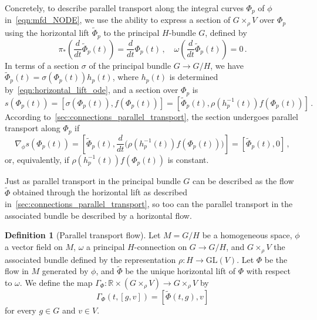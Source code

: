 \documentclass[12pt,a4paper]{article}
\numberwithin{equation}{section}
\newcommand{\R}{\mathbb{R}}
\theoremstyle{plain}
\theoremstyle{definition}
\newtheorem{definition}[theorem]{Definition}
\theoremstyle{remark}
\begin{document}
Concretely, to describe parallel transport along the integral curves $\Phi_p$ of $\phi$ in~\eqref{eqn:mfd_NODE}, we use the ability to express a section of $G \times_{\rho} V$ over $\Phi_p$ using the horizontal lift $\tilde{\Phi}_p$ to the principal $H$-bundle $G$, defined by
\begin{equation}
    \pi_*\left(\frac{d}{dt}\tilde{\Phi}_p(t)\right) = \frac{d}{dt}\Phi_p(t)\,, \quad \omega\left(\frac{d}{dt}\tilde{\Phi}_p(t)\right) = 0\,.
\end{equation}
In terms of a section $\sigma$ of the principal bundle $G \to G/H$, we have $\tilde{\Phi}_p(t) = \sigma(\Phi_p(t))h_p(t)$, where $h_p(t)$ is determined by~\eqref{eqn:horizontal_lift_ode}, and a section over $\Phi_p$ is
\begin{equation}\label{eq:section_associated_bundle}
    s(\Phi_p(t)) = \left[\sigma(\Phi_p(t)), f(\Phi_p(t))\right] = \left[\tilde{\Phi}_p(t), \rho(h_p^{-1}(t))f(\Phi_p(t))\right]\,.
    \end{equation}
According to~\cref{sec:connections_parallel_transport}, the section undergoes parallel transport along $\Phi_p$ if 
\begin{equation}\label{eqn:parallel_transport_section}
   \nabla_\phi s(\Phi_p(t)) =\left[\tilde{\Phi}_p(t), \frac{d}{dt}\big(\rho(h_p^{-1}(t))f(\Phi_p(t))\big)\right]=\left[\tilde{\Phi}_p(t), 0\right]\,,
\end{equation}
or, equivalently, if $\rho(h_p^{-1}(t))f(\Phi_p(t))$ is constant.

Just as parallel transport in the principal bundle $G$ can be described as the flow $\tilde{\Phi}$ obtained through the horizontal lift as described in~\cref{sec:connections_parallel_transport}, so too can the parallel transport in the associated bundle be described by a horizontal flow.

\begin{definition}[Parallel transport flow]\label{dfn:flow_ass_bundle}
    Let $M=G/H$ be a homogeneous space, $\phi$ a vector field on $M$, $\omega$ a principal $H$-connection on $G\to G/H$, and $G\times_{\rho} V$ the associated bundle defined by the representation $\rho: H \to \mathrm{GL}(V)$. Let $\Phi$ be the flow in $M$ generated by $\phi$, and $\tilde{\Phi}$ be the unique horizontal lift of $\Phi$ with respect to $\omega$. We define the map $\Gamma_{\Phi}:\R \times (G \times_{\rho} V) \to G \times_{\rho} V$ by
    \begin{equation}
        \Gamma_{\Phi}(t,[g,v]) = [\tilde{\Phi}(t,g),v]
    \end{equation}
    for every $g \in G$ and $v \in V$.
\end{definition}
\end{document}
